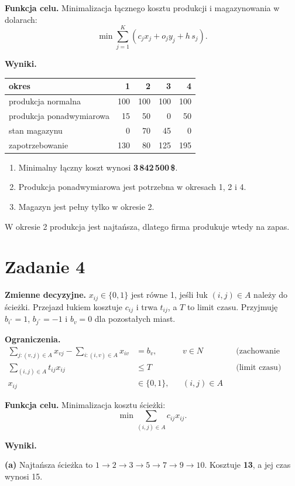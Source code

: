 \documentclass[11pt,a4paper]{article}
\begin{document}
\textbf{Funkcja celu.} Minimalizacja łącznego kosztu produkcji i magazynowania w dolarach:
\[ \min \sum_{j=1}^{K}\left(c_jx_j+o_jy_j+h\,s_j\right). \]

\textbf{Wyniki.}
\begin{center}
\begin{tabular}{@{}lrrrr@{}}
\toprule
okres & 1 & 2 & 3 & 4 \\ \midrule
produkcja normalna & 100 & 100 & 100 & 100 \\
produkcja ponadwymiarowa & 15 & 50 & 0 & 50 \\
stan magazynu & 0 & 70 & 45 & 0 \\
zapotrzebowanie & 130 & 80 & 125 & 195 \\
\bottomrule
\end{tabular}
\end{center}

\begin{enumerate}[label=(\alph*)]
\item Minimalny łączny koszt wynosi \textbf{3\,842\,500\,\$}.
\item Produkcja ponadwymiarowa jest potrzebna w okresach 1, 2 i 4.
\item Magazyn jest pełny tylko w okresie 2.
\end{enumerate}
W okresie 2 produkcja jest najtańsza, dlatego firma produkuje wtedy na zapas.

\section*{Zadanie 4}
\textbf{Zmienne decyzyjne.} $x_{ij}\in\{0,1\}$ jest równe 1, jeśli łuk $(i,j)\in A$ należy do ścieżki.
Przejazd łukiem kosztuje $c_{ij}$ i trwa $t_{ij}$, a $T$ to limit czasu. Przyjmuję $b_{i^\circ}=1$, $b_{j^\circ}=-1$ i $b_v=0$ dla pozostałych miast.

\textbf{Ograniczenia.}
\begin{align*}
\sum_{j:(v,j)\in A}x_{vj}-\sum_{i:(i,v)\in A}x_{iv} &= b_v, && v\in N && \text{(zachowanie przepływu)}\\
\sum_{(i,j)\in A} t_{ij}x_{ij} &\le T && && \text{(limit czasu)}\\
x_{ij} &\in\{0,1\}, && (i,j)\in A
\end{align*}

\textbf{Funkcja celu.} Minimalizacja kosztu ścieżki:
\[ \min \sum_{(i,j)\in A} c_{ij}x_{ij}. \]

\textbf{Wyniki.}

\textbf{(a)} Najtańsza ścieżka to $1\to2\to3\to5\to7\to9\to10$. Kosztuje \textbf{13}, a jej czas wynosi 15.
\end{document}
